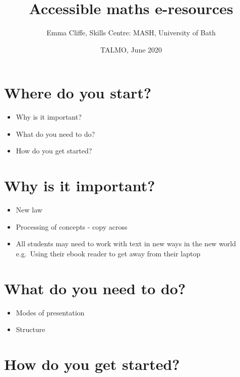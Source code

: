 \documentclass[
  17pt,
  english,
  a4paper]{extarticle}
\title{Accessible maths e-resources}
\author{Emma Cliffe, Skills Centre: MASH, University of Bath}
\date{TALMO, June 2020}
\providecommand{\tightlist}{%
  \setlength{\itemsep}{0pt}\setlength{\parskip}{0pt}}
\theoremstyle{plain}
\theoremstyle{plain}
\theoremstyle{plain}
\theoremstyle{plain}
\theoremstyle{plain}
\theoremstyle{definition}
\theoremstyle{definition}
\theoremstyle{definition}
\theoremstyle{remark}
\renewcommand{\;}{\,}
\begin{document}
\maketitle

{
\setcounter{tocdepth}{2}
\tableofcontents
}
\newpage
{}

\hypertarget{where-do-you-start}{%
\section*{Where do you start?}\label{where-do-you-start}}

\begin{itemize}
\tightlist
\item
  Why is it important?
\item
  What do you need to do?
\item
  How do you get started?
\end{itemize}

\hypertarget{why-is-it-important}{%
\section{Why is it important?}\label{why-is-it-important}}

\begin{itemize}
\tightlist
\item
  New law
\item
  Processing of concepts - copy across
\item
  All students may need to work with text in new ways in the new world e.g.~Using their ebook reader to get away from their laptop
\end{itemize}

\hypertarget{what-do-you-need-to-do}{%
\section{What do you need to do?}\label{what-do-you-need-to-do}}

\begin{itemize}
\tightlist
\item
  Modes of presentation
\item
  Structure
\end{itemize}

\hypertarget{how-do-you-get-started}{%
\section{How do you get started?}\label{how-do-you-get-started}}
\end{document}
